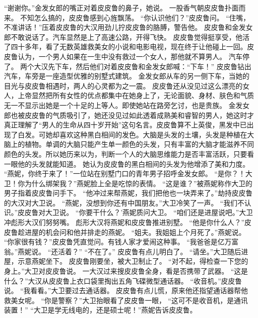 \documentclass[a4paper,12pt,UTF8,twoside]{ctexbook}
\begin{document}
        “谢谢你。”金发女郎的嘴正对着皮皮鲁的鼻子，她说。 
        一股香气朝皮皮鲁扑面而来。 
        不知怎么搞的，皮皮鲁感到心旌飘荡。 
        “你认识他们？”皮皮鲁问。 
        “住嘴，不准讲话！”压着皮皮鲁的大汉用劲儿拧皮皮鲁的胳膊，警告他。 
        皮皮鲁和金发女郎不敢说话了。汽车显然是上了高速公路，开得飞快。 
        皮皮鲁觉得挺享受，他活了四十多年，看了无数英雄救美女的小说和电影电视，现在终于让他碰上一回。皮皮鲁认为，一个男人如果在一生中没有救过一个女人，那他就不算男人。 
        汽车停了。 
        两个大汉先下车，然后他们对着皮皮鲁和金发女郎喊：“下车！” 
        皮皮鲁钻出汽车，车旁是一座造型优雅的别墅式建筑。 
        金发女郎从车的另一侧下车，当她的目光与皮皮鲁相遇时，两人的心灵都为之一震。 
        皮皮鲁还从没见过这么漂亮的女人，上帝显然把所有女性的优点都集中在她身上了，无论面貌、身材、肤色和气质无一不显示出她是一个十足的上等人。即使她站在路旁乞讨，也是贵族。 
        金发女郎也被皮皮鲁的气质吸引了，她还没见过如此透着成熟美和睿智的男人，她这时才真正理解了“男人的生命从四十岁开始”这句名言。皮皮鲁算不上英俊，黑发中已出现了白发。可她却喜欢这种黑白相间的发色。大脑是头发的土壤，头发是种植在大脑上的植物。单调的大脑只能产生单一颜色的头发，只有丰富的大脑才能滋养不同颜色的头发。所以她历来以为，判断一个人的大脑思维能力是否丰富活跃，只要看一眼他的头发就能知道。 
        她认为皮皮鲁的黑白相间的头发为他增添了美和力度。 
        “燕妮，你终于来了！”一位站在别墅门口的青年男子招呼金发女郎。 
        “是你？！大卫！你为什么绑架我？”燕妮脸上全是吃惊的表情。 
        “这是谁？”被燕妮称作大卫的男子指着皮皮鲁问手下。 
        “他冲过来帮燕妮，我们把他也一块弄来了。”劫持皮皮鲁的大汉对大卫说。 
        “燕妮，没想到你还有中国朋友。”大卫冷笑了一声。 
        “我们不认识。”皮皮鲁对大卫说。 
        “你要干什么？’燕妮质问大卫。 
        “咱们还是进屋说吧。”大卫冲彪形大汉们努努嘴。 
        彪形大汉将燕妮和皮皮鲁推进别墅。 
        “他是你什么人？”皮皮鲁趁进屋的机会问和他并排走的燕妮。 
        “姐夫。我姐姐上个月死了。”燕妮说。 
        “你家很有钱？”皮皮鲁凭直觉问。有钱人家才爱闹这种事。 
        “我爸爸是亿万富翁。”燕妮说。 
        “还活着？” 
        “不在了。” 
        皮皮鲁有点儿明白了。 
        “请坐。”大卫随后进屋，示意燕妮坐下。 
        皮皮鲁刚要坐，被大卫制止了。 
        “对不起，得检查一下您的身上。”大卫对皮皮鲁说。 
        一大汉过来搜皮皮鲁全身，看是否携带了武器。 
        “这是什么？”大汉从皮皮鲁上衣口袋里掏出五角飞碟微型通话器。 
        “收音机。”皮皮鲁说。 
        “我看看。”大卫要过去通话器。 
        皮皮鲁有点儿慌，原来他还指望通话器帮他救美女呢。 
        “你是警察？”大卫抬眼看了皮皮鲁一眼，  “这可不是收音机，是通讯装置！” 
        “大卫是学无线电的，还是硕士呢！”燕妮告诉皮皮鲁。 
\end{document}
